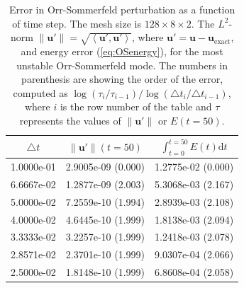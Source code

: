 \documentclass[11pt, oneside]{elsarticle}
\begin{document}
\begin{table}
	\centering
	\caption{Error in Orr-Sommerfeld perturbation as a function of time step. The mesh size is $128 \times 8 \times 2$. The $L^2$-norm $ \| \bm{u}' \| = \sqrt{\left< \bm{u}', \bm{u}'\right>}$, where $\bm{u}'=\bm{u}-\bm{u}_{\mathrm{exact}}$, and energy error (\ref{eq:OSenergy}), for the most unstable Orr-Sommerfeld mode. The numbers in parenthesis are showing the order of the error, computed as $\log(\tau_i/\tau_{i-1})/\log(\triangle t_i/ \triangle t_{i-1})$, where $i$ is the row number of the table and $\tau$ represents the values of $\|\bm{u}'\|$ or $E(t=50)$.  \label{tab:OS}}
	\begin{tabular}{ccc}	
 $\triangle t$ & $\| \bm{u}' \|(t=50)$ & $\int_{t=0}^{t=50}E(t) \mathrm{d}t$ \\
 \hline

1.0000e-01 & 2.9005e-09  (0.000) & 1.2775e-02 (0.000) \\
6.6667e-02 & 1.2877e-09  (2.003) & 5.3068e-03 (2.167) \\
5.0000e-02 & 7.2559e-10  (1.994) & 2.8939e-03 (2.108) \\
4.0000e-02 & 4.6445e-10  (1.999) & 1.8138e-03 (2.094) \\
3.3333e-02 & 3.2257e-10  (1.999) & 1.2418e-03 (2.078) \\
2.8571e-02 & 2.3701e-10  (1.999) & 9.0307e-04 (2.066) \\
2.5000e-02 & 1.8148e-10  (1.999) & 6.8608e-04 (2.058)
	\end{tabular}
\end{table}
\end{document}
